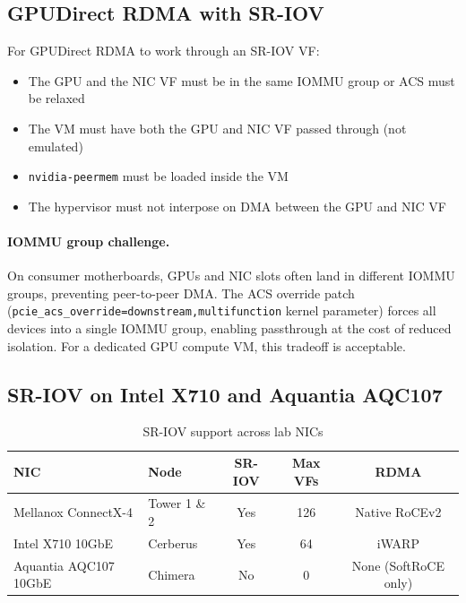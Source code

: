\documentclass[11pt,letterpaper]{article}
\begin{document}
\subsection{GPUDirect RDMA with SR-IOV}

For GPUDirect RDMA to work through an SR-IOV VF:

\begin{itemize}[noitemsep]
    \item The GPU and the NIC VF must be in the same IOMMU group or ACS must be relaxed
    \item The VM must have both the GPU and NIC VF passed through (not emulated)
    \item \texttt{nvidia-peermem} must be loaded inside the VM
    \item The hypervisor must not interpose on DMA between the GPU and NIC VF
\end{itemize}

\paragraph{IOMMU group challenge.}
On consumer motherboards, GPUs and NIC slots often land in different IOMMU groups, preventing peer-to-peer DMA. The ACS override patch (\texttt{pcie\_acs\_override=downstream,multifunction} kernel parameter) forces all devices into a single IOMMU group, enabling passthrough at the cost of reduced isolation. For a dedicated GPU compute VM, this tradeoff is acceptable.

\subsection{SR-IOV on Intel X710 and Aquantia AQC107}

\begin{table}[htbp]
\centering
\caption{SR-IOV support across lab NICs}
\label{tab:sriov-nics}
\begin{tabular}{@{}llccc@{}}
\toprule
\textbf{NIC} & \textbf{Node} & \textbf{SR-IOV} & \textbf{Max VFs} & \textbf{RDMA} \\
\midrule
Mellanox ConnectX-4 & Tower 1 \& 2 & Yes & 126 & Native RoCEv2 \\
Intel X710 10GbE & Cerberus & Yes & 64 & iWARP \\
Aquantia AQC107 10GbE & Chimera & No & 0 & None (SoftRoCE only) \\
\bottomrule
\end{tabular}
\end{table}
\end{document}
